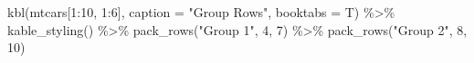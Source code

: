\documentclass[
]{article}
\newenvironment{Shaded}{\begin{snugshade}}{\end{snugshade}}
\newcommand{\AttributeTok}[1]{\textcolor[rgb]{0.77,0.63,0.00}{#1}}
\newcommand{\DecValTok}[1]{\textcolor[rgb]{0.00,0.00,0.81}{#1}}
\newcommand{\FunctionTok}[1]{\textcolor[rgb]{0.00,0.00,0.00}{#1}}
\newcommand{\NormalTok}[1]{#1}
\newcommand{\SpecialCharTok}[1]{\textcolor[rgb]{0.00,0.00,0.00}{#1}}
\newcommand{\StringTok}[1]{\textcolor[rgb]{0.31,0.60,0.02}{#1}}
\begin{document}
\newpage

\begin{Shaded}
\begin{Highlighting}[]
\FunctionTok{kbl}\NormalTok{(mtcars[}\DecValTok{1}\SpecialCharTok{:}\DecValTok{10}\NormalTok{, }\DecValTok{1}\SpecialCharTok{:}\DecValTok{6}\NormalTok{], }\AttributeTok{caption =} \StringTok{"Group Rows"}\NormalTok{, }\AttributeTok{booktabs =}\NormalTok{ T) }\SpecialCharTok{\%\textgreater{}\%} \FunctionTok{kable\_styling}\NormalTok{() }\SpecialCharTok{\%\textgreater{}\%}
  \FunctionTok{pack\_rows}\NormalTok{(}\StringTok{"Group 1"}\NormalTok{, }\DecValTok{4}\NormalTok{, }\DecValTok{7}\NormalTok{) }\SpecialCharTok{\%\textgreater{}\%}
  \FunctionTok{pack\_rows}\NormalTok{(}\StringTok{"Group 2"}\NormalTok{, }\DecValTok{8}\NormalTok{, }\DecValTok{10}\NormalTok{)}
\end{Highlighting}
\end{Shaded}

\newpage
\end{document}
